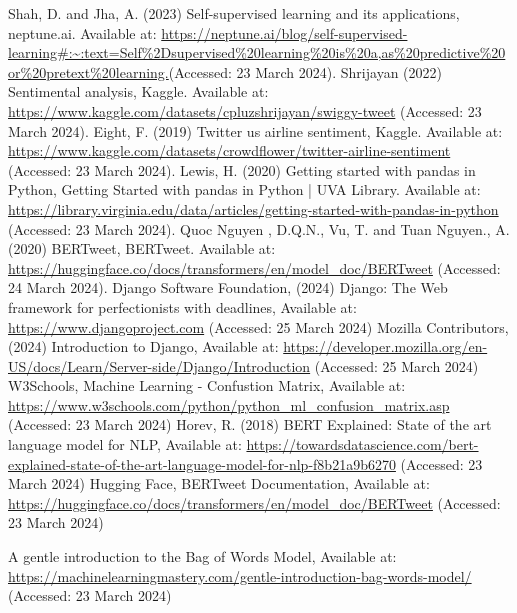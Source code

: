 \documentclass[conference]{IEEEtran}
\begin{document}
\begin{thebibliography}{00}
 Shah, D. and Jha, A. (2023) Self-supervised learning and its applications, neptune.ai. Available at: \url{https://neptune.ai/blog/self-supervised-learning#:~:text=Self%2Dsupervised%20learning%20is%20a,as%20predictive%20or%20pretext%20learning.}(Accessed: 23 March 2024). 
 Shrijayan (2022) Sentimental analysis, Kaggle. Available at: \url{ https://www.kaggle.com/datasets/cpluzshrijayan/swiggy-tweet} (Accessed: 23 March 2024).  
 Eight, F. (2019) Twitter us airline sentiment, Kaggle. Available at: \url{https://www.kaggle.com/datasets/crowdflower/twitter-airline-sentiment} (Accessed: 23 March 2024). 
 Lewis, H. (2020) Getting started with pandas in Python, Getting Started with pandas in Python | UVA Library. Available at: \url{https://library.virginia.edu/data/articles/getting-started-with-pandas-in-python} (Accessed: 23 March 2024). 
 Quoc Nguyen , D.Q.N.,  Vu, T. and Tuan Nguyen., A. (2020) BERTweet, BERTweet. Available at: \url{https://huggingface.co/docs/transformers/en/model_doc/BERTweet} (Accessed: 24 March 2024). 
 Django Software Foundation, (2024) Django: The Web framework for perfectionists with deadlines, Available at: \url{https://www.djangoproject.com} (Accessed: 25 March 2024)
 Mozilla Contributors, (2024) Introduction to Django, Available at: \url{https://developer.mozilla.org/en-US/docs/Learn/Server-side/Django/Introduction} (Accessed: 25 March 2024)
 W3Schools, Machine Learning - Confustion Matrix, Available at: \url{https://www.w3schools.com/python/python_ml_confusion_matrix.asp} (Accessed: 23 March 2024)
 Horev, R. (2018) BERT Explained: State of the art language model for NLP, Available at: \url{https://towardsdatascience.com/bert-explained-state-of-the-art-language-model-for-nlp-f8b21a9b6270} (Accessed: 23 March 2024)
 Hugging Face, BERTweet Documentation, Available at: \url{https://huggingface.co/docs/transformers/en/model_doc/BERTweet} (Accessed: 23 March 2024)

 A gentle introduction to the Bag of Words Model, Available at: \url{https://machinelearningmastery.com/gentle-introduction-bag-words-model/} (Accessed: 23 March 2024)
\end{thebibliography}
\vspace{12pt}
\end{document}
